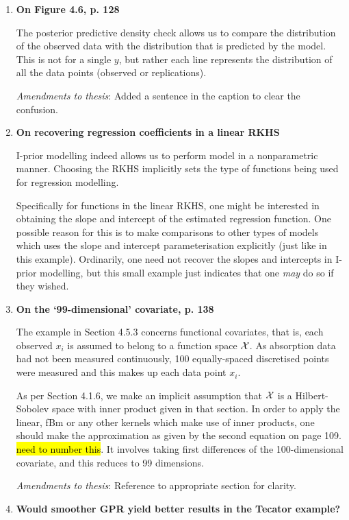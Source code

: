 \documentclass[11pt,showframe]{report}
\begin{document}
\begin{enumerate}
  \item \textbf{On Figure 4.6, p. 128}

  The posterior predictive density check allows us to compare the distribution of the observed data with the distribution that is predicted by the model. 
  This is not for a single $y$, but rather each line represents the distribution of all the data points (observed or replications).
  
  \textit{Amendments to thesis}: Added a sentence in the caption to clear the confusion.
  
  \item \textbf{On recovering regression coefficients in a linear RKHS}

  I-prior modelling indeed allows us to perform model in a nonparametric manner.
  Choosing the RKHS implicitly sets the type of functions being used for regression modelling.
  
  Specifically for functions in the linear RKHS, one might be interested in obtaining the slope and intercept of the estimated regression function.
  One possible reason for this is to make comparisons to other types of models which uses the slope and intercept parameterisation explicitly (just like in this example).
  Ordinarily, one need not recover the slopes and intercepts in I-prior modelling, but this small example just indicates that one \emph{may} do so if they wished.

  \item \textbf{On the `99-dimensional' covariate, p. 138}
  
  The example in Section 4.5.3 concerns functional covariates, that is, each observed $x_i$ is assumed to belong to a function space ${\mathcal X}$. 
  As absorption data had not been measured continuously, 100 equally-spaced discretised points were measured and this makes up each data point $x_i$.
  
  As per Section 4.1.6, we make an implicit assumption that ${\mathcal X}$ is a Hilbert-Sobolev space with inner product given in that section.
  In order to apply the linear, fBm or any other kernels which make use of inner products, one should make the approximation as given by the second equation on page 109. \hl{need to number this}.
  It involves taking first differences of the 100-dimensional covariate, and this reduces to 99 dimensions.

  \textit{Amendments to thesis}: Reference to appropriate section for clarity.
  
  \item \textbf{Would smoother GPR yield better results in the Tecator example?}


\end{enumerate}
\end{document}
